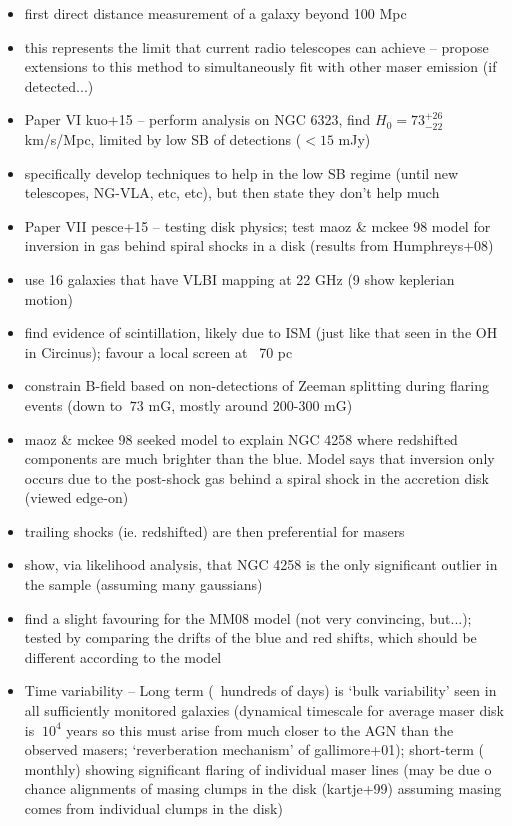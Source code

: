 \begin{itemize}
\item first direct distance measurement of a galaxy beyond 100 Mpc
\item this represents the limit that current radio telescopes can achieve -- propose extensions to this method to simultaneously fit with other maser emission (if detected...)
\item Paper VI kuo+15 -- perform analysis on NGC 6323, find $H_0=73^{+26}_{-22}$ km/s/Mpc, limited by low SB of detections ($\lt 15$ mJy)
\item specifically develop techniques to help in the low SB regime (until new telescopes, NG-VLA, etc, etc), but then state they don't help much
\item Paper VII pesce+15 -- testing disk physics; test maoz & mckee 98 model for inversion in gas behind spiral shocks in a disk (results from Humphreys+08)
\item use 16 galaxies that have VLBI mapping at 22 GHz (9 show keplerian motion) 
\item find evidence of scintillation, likely due to ISM (just like that seen in the OH in Circinus); favour a local screen at ~70 pc
\item constrain B-field based on non-detections of Zeeman splitting during flaring events (down to $~73$ mG, mostly around 200-300 mG)
\item maoz & mckee 98 seeked model to explain NGC 4258 where redshifted components are much brighter than the blue. Model says that inversion only occurs due to the post-shock gas behind a spiral shock in the accretion disk (viewed edge-on)
\item trailing shocks (ie. redshifted) are then preferential for masers
\item show, via likelihood analysis, that NGC 4258 is the only significant outlier in the sample (assuming many gaussians)
\item find a slight favouring for the MM08 model (not very convincing, but...); tested by comparing the drifts of the blue and red shifts, which should be different according to the model
\item Time variability -- Long term (~hundreds of days) is `bulk variability' seen in all sufficiently monitored galaxies (dynamical timescale for average maser disk is $~10^4$ years so this must arise from much closer to the AGN than the observed masers; `reverberation mechanism' of gallimore+01); short-term ($~$monthly) showing significant flaring of individual maser lines (may be due o chance alignments of masing clumps in the disk (kartje+99) assuming masing comes from individual clumps in the disk)

\end{itemize}
